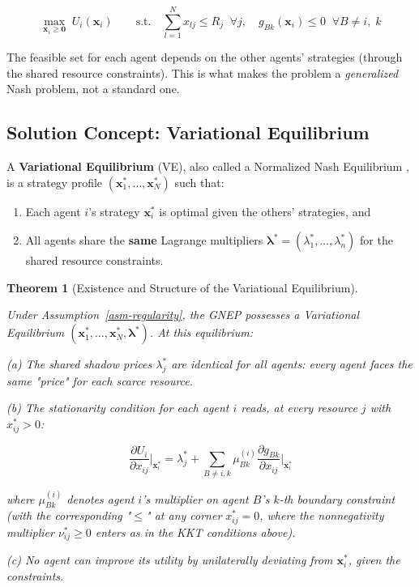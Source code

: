 \documentclass[11pt]{article}
\theoremstyle{plain}
\newtheorem{theorem}{Theorem}
\theoremstyle{definition}
\theoremstyle{remark}
\let\origsubsection\subsection
\renewcommand{\subsection}{\needspace{7\baselineskip}\origsubsection}
\providecommand{\tightlist}{%
  \setlength{\itemsep}{0pt}\setlength{\parskip}{0pt}}
\begin{document}
\[\max_{\mathbf{x}_i \geq \mathbf{0}} \; U_i(\mathbf{x}_i) \qquad \text{s.t.} \quad \sum_{l=1}^{N} x_{lj} \leq R_j \;\; \forall j, \quad g_{Bk}(\mathbf{x}_i) \leq 0 \;\; \forall B \neq i, \; k\]

The feasible set for each agent depends on the other agents' strategies
(through the shared resource constraints). This is what makes the
problem a \emph{generalized} Nash problem, not a standard one.

\subsection{Solution Concept: Variational
Equilibrium}\label{solution-concept-variational-equilibrium}

A \textbf{Variational Equilibrium} (VE), also called a Normalized Nash
Equilibrium \citep{Rosen1965}, is a strategy profile
\((\mathbf{x}_1^*, \ldots, \mathbf{x}_N^*)\) such that:

\begin{enumerate}
\def\labelenumi{\arabic{enumi}.}
\tightlist
\item
  Each agent \(i\)'s strategy \(\mathbf{x}_i^*\) is optimal given the
  others' strategies, and
\item
  All agents share the \textbf{same} Lagrange multipliers
  \(\boldsymbol{\lambda}^* = (\lambda_1^*, \ldots, \lambda_n^*)\) for
  the shared resource constraints.
\end{enumerate}

\begin{theorem}[Existence and Structure of the Variational Equilibrium]
\label{thm-variational-equilibrium}

Under Assumption~\ref{asm-regularity}, the GNEP possesses a Variational Equilibrium $(\mathbf{x}_1^*, \ldots, \mathbf{x}_N^*, \boldsymbol{\lambda}^*)$. At this equilibrium:

(a) The shared shadow prices $\lambda_j^*$ are identical for all agents: every agent faces the same "price" for each scarce resource.

(b) The stationarity condition for each agent $i$ reads, at every resource $j$ with $x_{ij}^* > 0$:

$$\frac{\partial U_i}{\partial x_{ij}}\bigg|_{\mathbf{x}_i^*} = \lambda_j^* + \sum_{B \neq i, k} \mu_{Bk}^{(i)} \frac{\partial g_{Bk}}{\partial x_{ij}}\bigg|_{\mathbf{x}_i^*}$$

where $\mu_{Bk}^{(i)}$ denotes agent $i$'s multiplier on agent $B$'s $k$-th boundary constraint (with the corresponding "$\leq$" at any corner $x_{ij}^* = 0$, where the nonnegativity multiplier $\nu_{ij}^* \geq 0$ enters as in the KKT conditions above).

(c) No agent can improve its utility by unilaterally deviating from $\mathbf{x}_i^*$, given the constraints.
\end{theorem}
\end{document}
